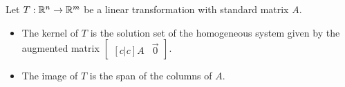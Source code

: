 \begin{applicationActivities}
\begin{observation}
Let  $T:\mathbb{R}^n\to\mathbb{R}^m$ be a linear transformation with standard matrix $A$.

\begin{itemize}
\item The kernel of \(T\) is the solution set of the homogeneous system given
by the augmented matrix $\begin{bmatrix}[c|c]A&\vec 0\end{bmatrix}$.
\item The image of \(T\) is the span of the columns of \(A\).
\end{itemize}
\end{observation}

\end{applicationActivities}
